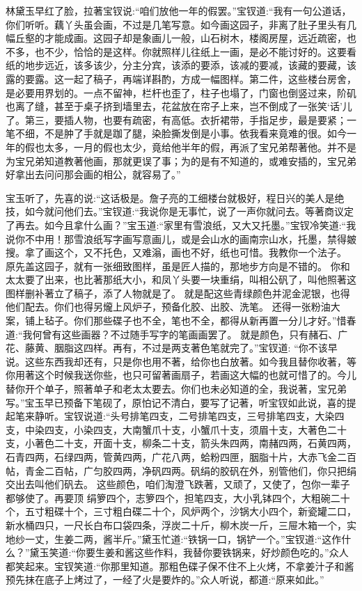 \begin{parag}
    林黛玉早红了脸，拉著宝钗说:“咱们放他一年的假罢。”宝钗道:“我有一句公道话，你们听听。藕丫头虽会画，不过是几笔写意。如今画这园子，非离了肚子里头有几幅丘壑的才能成画。这园子却是象画儿一般，山石树木，楼阁房屋，远近疏密，也不多，也不少，恰恰的是这样。你就照样儿往纸上一画，是必不能讨好的。这要看纸的地步远近，该多该少，分主分宾，该添的要添，该减的要减，该藏的要藏，该露的要露。这一起了稿子，再端详斟酌，方成一幅图样。第二件，这些楼台房舍，是必要用界划的。一点不留神，栏杆也歪了，柱子也塌了，门窗也倒竖过来，阶矶也离了缝，甚至于桌子挤到墙里去，花盆放在帘子上来，岂不倒成了一张笑‘话’儿了。第三，要插人物，也要有疏密，有高低。衣折裙带，手指足步，最是要紧；一笔不细，不是肿了手就是跏了腿，染脸撕发倒是小事。依我看来竟难的很。如今一年的假也太多，一月的假也太少，竟给他半年的假，再派了宝兄弟帮著他。并不是为宝兄弟知道教著他画，那就更误了事；为的是有不知道的，或难安插的，宝兄弟好拿出去问问那会画的相公，就容易了。”
\end{parag}


\begin{parag}
    宝玉听了，先喜的说:“这话极是。詹子亮的工细楼台就极好，程日兴的美人是绝技，如今就问他们去。”宝钗道:“我说你是无事忙，说了一声你就问去。等著商议定了再去。如今且拿什么画？”宝玉道:“家里有雪浪纸，又大又托墨。”宝钗冷笑道:“我说你不中用！那雪浪纸写字画写意画儿，或是会山水的画南宗山水，托墨，禁得皴搜。拿了画这个，又不托色，又难滃，画也不好，纸也可惜。我教你一个法子。
    原先盖这园子，就有一张细致图样，虽是匠人描的，那地步方向是不错的。
    你和太太要了出来，也比著那纸大小，和凤丫头要一块重绢，叫相公矾了，叫他照著这图样删补著立了稿子，添了人物就是了。
    就是配这些青绿颜色并泥金泥银，也得他们配去。你们也得另爖上风炉子，预备化胶、出胶、洗笔。
    还得一张粉油大案，铺上毡子。你们那些碟子也不全，笔也不全，都得从新再置一分儿才好。”惜春道:“我何曾有这些画器？不过随手写字的笔画画罢了。
    就是颜色，只有赭石、广花、藤黄、胭脂这四样。再有，不过是两支著色笔就完了。”宝钗道: “你不该早说。这些东西我却还有，只是你也用不著，给你也白放著。如今我且替你收著，等你用著这个时候我送你些，也只可留著画扇子，若画这大幅的也就可惜了的。今儿替你开个单子，照著单子和老太太要去。你们也未必知道的全，我说著，宝兄弟写。”宝玉早已预备下笔砚了，原怕记不清白，要写了记著，听宝钗如此说，喜的提起笔来静听。宝钗说道:“头号排笔四支，二号排笔四支，三号排笔四支，大染四支，中染四支，小染四支，大南蟹爪十支，小蟹爪十支，须眉十支，大著色二十支，小著色二十支，开面十支，柳条二十支，箭头朱四两，南赭四两，石黄四两，石青四两，石绿四两，管黄四两，广花八两，蛤粉四匣，胭脂十片，大赤飞金二百帖，青金二百帖，广匀胶四两，净矾四两。矾绢的胶矾在外，别管他们，你只把绢交出去叫他们矾去。
    这些颜色，咱们淘澄飞跌著，又顽了，又使了，包你一辈子都够使了。再要顶 绢箩四个，志箩四个，担笔四支，大小乳钵四个，大粗碗二十个，五寸粗碟十个，三寸粗白碟二十个，风炉两个，沙锅大小四个，新瓷罐二口，新水桶四只，一尺长白布口袋四条，浮炭二十斤，柳木炭一斤，三屉木箱一个，实地纱一丈，生姜二两，酱半斤。”黛玉忙道:“铁锅一口，锅铲一个。”宝钗道:“这作什么？”黛玉笑道:“你要生姜和酱这些作料，我替你要铁锅来，好炒颜色吃的。”众人都笑起来。宝钗笑道:“你那里知道。那粗色碟子保不住不上火烤，不拿姜汁子和酱预先抹在底子上烤过了，一经了火是要炸的。”众人听说，都道:“原来如此。”
\end{parag}


